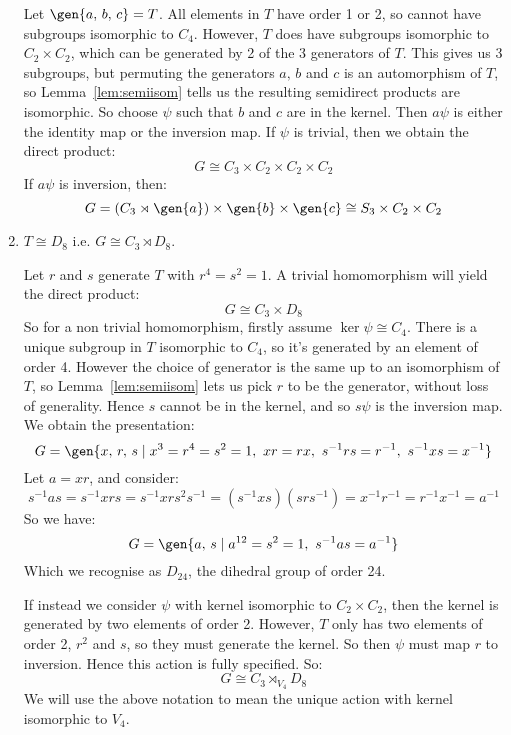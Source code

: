 \begin{enumerate}
        Let \(\gen{a,\,b,\,c} = T\).
        All elements in \(T\) have order 1 or 2, so cannot have subgroups isomorphic to \(C_4\).
        However, \(T\) does have subgroups isomorphic to \(C_2 \times C_2\), which can be generated by 2 of the 3
        generators of \(T\).
        This gives us 3 subgroups, but permuting the generators \(a,\,b\) and \(c\) is an automorphism of \(T\), so
        Lemma~\ref{lem:semiisom} tells us the resulting semidirect products are isomorphic.
        So choose \(\psi\) such that \(b\) and \(c\) are in the kernel.
        Then \(a\psi\) is either the identity map or the inversion map.
        If \(\psi\) is trivial, then we obtain the direct product:
        \[G \cong C_3 \times C_2 \times C_2 \times C_2\]
        If \(a\psi\) is inversion, then:
        \[G = (C_3 \rtimes \gen{a}) \times \gen{b} \times \gen{c} \cong S_3 \times C_2 \times C_2\]
    \item \(T \cong D_8\) i.e. \(G \cong C_3 \rtimes D_8\).

        Let \(r\) and \(s\) generate \(T\) with \(r^4 = s^2 = 1\).
        A trivial homomorphism will yield the direct product:
        \[G \cong C_3 \times D_8\]
        So for a non trivial homomorphism, firstly assume \(\ker\psi \cong C_4\).
        There is a unique subgroup in \(T\) isomorphic to \(C_4\), so it's generated by an element of order 4.
        However the choice of generator is the same up to an isomorphism of \(T\), so Lemma~\ref{lem:semiisom} lets us
        pick \(r\) to be the generator, without loss of generality.
        Hence \(s\) cannot be in the kernel, and so \(s\psi\) is the inversion map.
        We obtain the presentation:
        \[G = \gen{x,\,r,\,s \mid x^3 = r^4 = s^2 = 1,\ xr = rx,\ s^{-1}rs = r^{-1},\ s^{-1}xs = x^{-1}}\]
        Let \(a = xr\), and consider:
        \[s^{-1}as = s^{-1}xrs = s^{-1}xrs^2 s^{-1} = (s^{-1}xs)(srs^{-1}) = x^{-1}r^{-1} = r^{-1}x^{-1} = a^{-1}\]
        So we have:
        \[G = \gen{a,\,s \mid a^{12} = s^2 = 1,\ s^{-1}as = a^{-1}}\]
        Which we recognise as \(D_{24}\), the dihedral group of order 24.

        If instead we consider \(\psi\) with kernel isomorphic to \(C_2 \times C_2\), then the kernel is generated by
        two elements of order 2.
        However, \(T\) only has two elements of order 2, \(r^2\) and \(s\), so they must generate the kernel.
        So then \(\psi\) must map \(r\) to inversion.
        Hence this action is fully specified.
        So:
        \[G \cong C_3 \rtimes_{V_4} D_8\]
        We will use the above notation to mean the unique action with kernel isomorphic to \(V_4\).


\end{enumerate}
